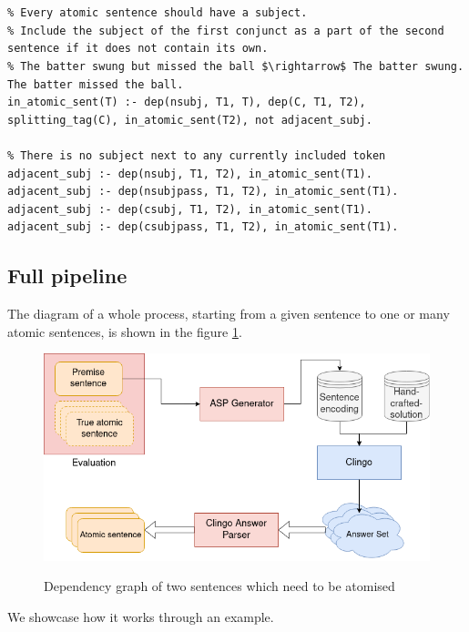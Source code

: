 \begin{lstlisting}
 

% Every atomic sentence should have a subject.
% Include the subject of the first conjunct as a part of the second sentence if it does not contain its own.
% The batter swung but missed the ball $\rightarrow$ The batter swung. The batter missed the ball.
in_atomic_sent(T) :- dep(nsubj, T1, T), dep(C, T1, T2), splitting_tag(C), in_atomic_sent(T2), not adjacent_subj.

% There is no subject next to any currently included token
adjacent_subj :- dep(nsubj, T1, T2), in_atomic_sent(T1).
adjacent_subj :- dep(nsubjpass, T1, T2), in_atomic_sent(T1).
adjacent_subj :- dep(csubj, T1, T2), in_atomic_sent(T1).
adjacent_subj :- dep(csubjpass, T1, T2), in_atomic_sent(T1).
\end{lstlisting}


\subsection{Full pipeline}

The diagram of a whole process, starting from a given sentence to one or many atomic sentences, is shown in the figure \ref{test-architecture-diagram}.

\begin{figure}[h]
\caption{Dependency graph of two sentences which need to be atomised}
\vspace{10pt}
\centering
\includegraphics[width=\textwidth]{solving-nlp-tasks-logically/Test architecture diagram.png}
\label{test-architecture-diagram}
\end{figure}

We showcase how it works through an example.

